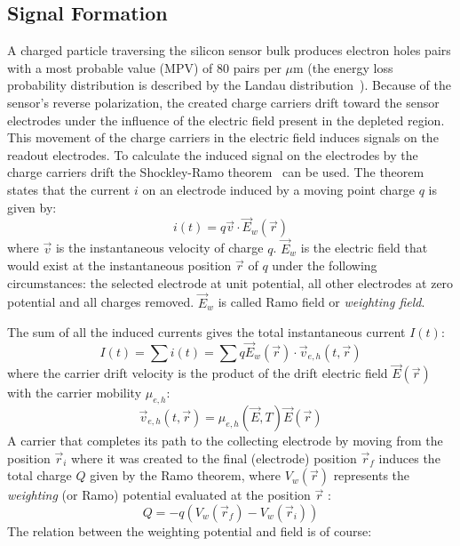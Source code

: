\subsection{Signal Formation}
\label{sec:SigForm}

A charged particle traversing the silicon sensor bulk produces electron holes pairs with a most 
probable value (MPV) of 80 pairs per $\mu$m (the energy loss
probability distribution is  described by the  Landau distribution~\cite{Landau:1944if}). 
Because of the sensor's reverse
polarization, the created charge carriers drift toward the sensor electrodes under the influence of
the electric field present in the depleted region. This movement of the charge carriers in the electric 
field induces signals on the readout electrodes.
To calculate the induced signal on the electrodes by the charge carriers drift the Shockley-Ramo 
theorem~\cite{ShockleyPot,Ramo,HE2001250} can be used.
The theorem states that the current $i$ on an electrode induced by a moving point 
charge $q$ is given by:
\begin{equation}
  i(t) =q\vec{v}\cdot\vec{E}_{w}(\vec{r}) 
\end{equation}
where $\vec{v}$ is the instantaneous velocity of charge $q$. $\vec{E}_{w}$ is  the 
electric field that would exist at the instantaneous position $\vec{r}$ of $q$ under the 
following circumstances: the selected electrode at unit potential, all other electrodes at zero potential 
and all charges removed. $\vec{E}_{w}$ is called Ramo field or {\it weighting field}.

The sum of all the induced currents gives the total instantaneous current $I(t)$:
\begin{equation}
I(t) = \sum i(t)=\sum q\vec{E}_w(\vec{r})\cdot\vec{v}_{e,h}(t,\vec{r})
\label{eq:current}
\end{equation}
where the carrier drift velocity is the product of the drift electric field $\vec{E}(\vec{r})$ with the carrier mobility $\mu_{e,h}$:
\begin{equation}
\vec{v}_{e,h}(t,\vec{r})=\mu_{e,h}(\vec{E},T)\vec{E}(\vec{r})
\label{eq:carrierV}
\end{equation}
A carrier that completes its path to the collecting electrode by moving from the position $\vec{r}_i$ where it was created to the
final (electrode) position $\vec{r}_f$ induces the total charge $Q$ given by the Ramo theorem, where 
$V_w(\vec{r})$ represents the {\it weighting} (or Ramo) potential evaluated at the position $\vec{r}$ :
\begin{equation}
Q = - q\left(V_w(\vec{r}_f)-V_w(\vec{r}_i)\right)
\label{eq:signal}
\end{equation}
The relation between the weighting potential and field is of course:

